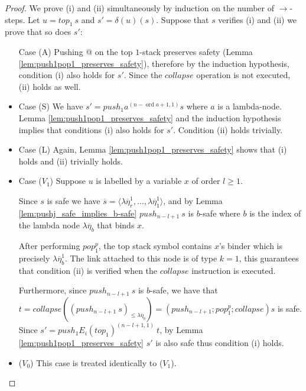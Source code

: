 \documentclass{article}
\newcommand{\ord}{\mathop{\mathrm{ord}}}
\newcommand{\prefixof}{\leqslant}
\theoremstyle{remark}
\theoremstyle{definition}
\newcommand\orddec\overline
\begin{document}
\begin{proof}
We prove (i) and (ii) simultaneously by induction on the number of
$\rightarrow$-steps. Let $u = top_1\ s$ and $s' =\delta(u)(s)$.
Suppose that $s$ verifies (i) and (ii) we prove that so does $s'$:
\begin{itemize}
\item[Case (A)] Pushing @ on the top $1$-stack preserves safety (Lemma
\ref{lem:push1pop1_preserves_safety}), therefore by the
induction hypothesis, condition (i) also holds for $s'$. Since
the $collapse$ operation is not executed, (ii) holds as well.

\item Case (S)
We have $s' = push_1 a^{(n-\ord{a}+1,1)} s$ where $a$ is a
lambda-node. Lemma \ref{lem:push1pop1_preserves_safety} and the
induction hypothesis implies that conditions (i) also holds for
$s'$. Condition (ii) holds trivially.

\item Case (L) Again, Lemma \ref{lem:push1pop1_preserves_safety}
shows that (i) holds and (ii) trivially holds.

\item Case ($V_1$) Suppose $u$ is labelled by a variable $x$ of order $l\geq 1$.

Since $s$ is safe we have $ \orddec{s} = \langle \lambda
\overline{\eta}_r^1 , \ldots, \lambda \overline{\eta}_1^1
\rangle$, and by Lemma \ref{lem:pushj_safe_implies_b-safe}
$push_{n-l+1}\ s$ is $b$-safe where $b$ is the index of the
lambda node $\lambda \overline{\eta}_{b}$ that binds $x$.

%
%

After performing $pop_1^p$, the top stack symbol contains $x$'s
binder which is precisely $\lambda \overline{\eta}_{b}^1$. The
link attached to this node is of type $k=1$, this guarantees
that condition (ii) is verified when the $collapse$ instruction
is executed.

Furthermore, since $push_{n-l+1}\ s$ is $b$-safe, we have that
$t = collapse \left( (push_{n-l+1}\ s)_{\prefixof \lambda
\overline{\eta}_{b}} \right) = (push_{n-l+1};pop_1^p;collapse)
s$ is safe. Since $s' = push_1 E_i(top_1)^{(n-l+1,1)}\ t$, by
Lemma \ref{lem:push1pop1_preserves_safety} $s'$ is also safe
thus condition (i) holds.

\item ($V_0$) This case is treated identically to ($V_1$).
\end{itemize}
\end{proof}



\end{document}

